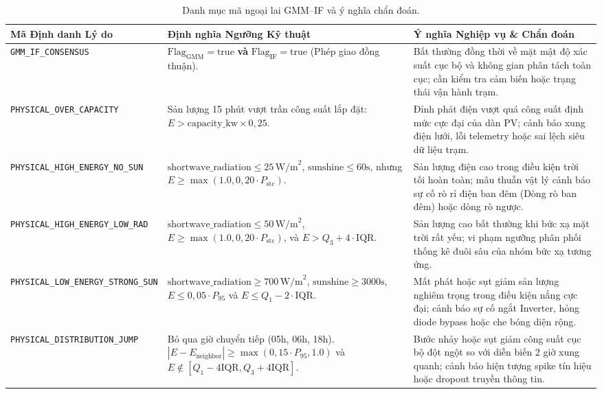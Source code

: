 \documentclass[12pt, a4paper]{report}
\begin{document}
\begin{table}[H]
\centering
\small
\renewcommand{\arraystretch}{1.3}
\begin{tabularx}{\textwidth}{@{} l p{4.5cm} X @{}}
\toprule
\textbf{Mã Định danh Lý do} & \textbf{Định nghĩa Ngưỡng Kỹ thuật} & \textbf{Ý nghĩa Nghiệp vụ \& Chẩn đoán} \\
\midrule
\texttt{GMM\_IF\_CONSENSUS} & 
$\text{Flag}_{\text{GMM}} = \text{true}$ \textbf{và} $\text{Flag}_{\text{IF}} = \text{true}$ (Phép giao đồng thuận). & 
Bất thường đồng thời về mặt mật độ xác suất cục bộ và không gian phân tách toàn cục; cần kiểm tra cảm biến hoặc trạng thái vận hành trạm. \\
\midrule
\texttt{PHYSICAL\_OVER\_CAPACITY} & 
Sản lượng 15 phút vượt trần công suất lắp đặt: $E > \text{capacity\_kw} \times 0{,}25$. & 
Đỉnh phát điện vượt quá công suất định mức cực đại của dàn PV; cảnh báo xung điện lưới, lỗi telemetry hoặc sai lệch siêu dữ liệu trạm. \\
\midrule
\texttt{PHYSICAL\_HIGH\_ENERGY\_NO\_SUN} & 
$\text{shortwave\_radiation} \le 25 \, \text{W/m}^2$, $\text{sunshine} \le 60\text{s}$, nhưng $E \ge \max(1.0, 0{,}20 \cdot P_{\text{stc}})$. & 
Sản lượng điện cao trong điều kiện trời tối hoàn toàn; mâu thuẫn vật lý cảnh báo sự cố rò rỉ điện ban đêm (Dòng rò ban đêm) hoặc dòng rò ngược. \\
\midrule
\texttt{PHYSICAL\_HIGH\_ENERGY\_LOW\_RAD} & 
$\text{shortwave\_radiation} \le 50 \, \text{W/m}^2$, $E \ge \max(1.0, 0{,}20 \cdot P_{\text{stc}})$, và $E > Q_3 + 4 \cdot \text{IQR}$. & 
Sản lượng cao bất thường khi bức xạ mặt trời rất yếu; vi phạm ngưỡng phân phối thống kê đuôi sâu của nhóm bức xạ tương ứng. \\
\midrule
\texttt{PHYSICAL\_LOW\_ENERGY\_STRONG\_SUN} & 
$\text{shortwave\_radiation} \ge 700 \, \text{W/m}^2$, $\text{sunshine} \ge 3000\text{s}$, $E \le 0{,}05 \cdot P_{95}$ và $E \le Q_1 - 2 \cdot \text{IQR}$. & 
Mất phát hoặc sụt giảm sản lượng nghiêm trọng trong điều kiện nắng cực đại; cảnh báo sự cố ngắt Inverter, hỏng diode bypass hoặc che bóng diện rộng. \\
\midrule
\texttt{PHYSICAL\_DISTRIBUTION\_JUMP} & 
Bỏ qua giờ chuyển tiếp (05h, 06h, 18h). $|E - E_{\text{neighbor}}| \ge \max(0{,}15 \cdot P_{95}, 1.0)$ và $E \notin [Q_1 - 4\text{IQR}, Q_3 + 4\text{IQR}]$. & 
Bước nhảy hoặc sụt giảm công suất cục bộ đột ngột so với diễn biến 2 giờ xung quanh; cảnh báo hiện tượng spike tín hiệu hoặc dropout truyền thông tin. \\
\bottomrule
\end{tabularx}
\caption{Danh mục mã ngoại lai GMM--IF và ý nghĩa chẩn đoán.}
\label{tab:outlier_reasons_dict}
\end{table}
\end{document}
